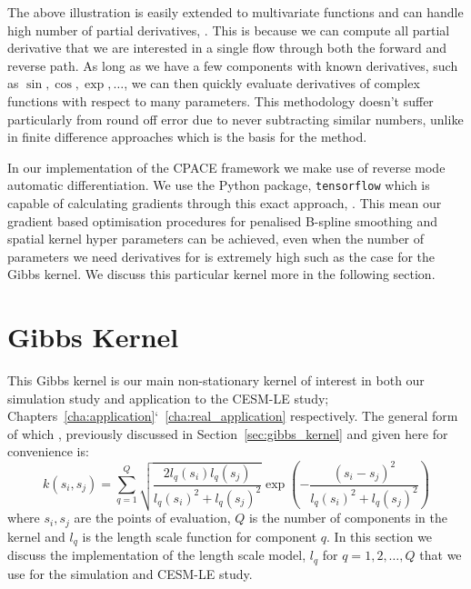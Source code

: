 The above illustration is easily extended to multivariate functions and can handle high number of partial derivatives, \citep{neidinger_introduction_2010}.
This is because we can compute all partial derivative that we are interested in a single flow through both the forward and reverse path.
As long as we have a few components with known derivatives, such as $\sin, \cos, \exp, \dots$, we can then quickly evaluate derivatives of complex functions with respect to many parameters.
This methodology doesn't suffer particularly from round off error due to never subtracting similar numbers, unlike in finite difference approaches which is the basis for the method.

In our implementation of the CPACE framework we make use of reverse mode automatic differentiation.
We use the Python package, \verb*|tensorflow| which is capable of calculating gradients through this exact approach, \citep{abadi_tensorflow_2016}. 
This mean our gradient based optimisation procedures for penalised B-spline smoothing and spatial kernel hyper parameters can be achieved, even when the number of parameters we need derivatives for is extremely high such as the case for the Gibbs kernel.
We discuss this particular kernel more in the following section.


\section{Gibbs Kernel \label{sec:gibbs_kernel}}
This Gibbs kernel is our main non-stationary kernel of interest in both our simulation study and application to the CESM-LE study; Chapters~\ref{cha:application}`~\ref{cha:real_application} respectively.
The general form of which , previously discussed in Section~\ref{sec:gibbs_kernel} and given here for convenience is: 
\begin{equation}
	k\left(s_{i}, s_{j}\right) = \sum_{q=1}^{Q} \sqrt{\frac{2l_q(s_i)l_q(s_j)}{l_q(s_i)^2 + l_q(s_j)^2}} \exp \left(-\frac{\left(s_i - s_j\right)^2}{l_q(s_i)^2 + l_q(s_j)^2}\right)
\end{equation}
where $s_i, s_j$ are the points of evaluation, $Q$ is the number of components in the kernel and $l_q$ is the length scale  function for component $q$.
In this section we discuss the implementation of the length scale model, $l_q$ for $q=1,2,\dots,Q$ that we use for the simulation and CESM-LE study.

